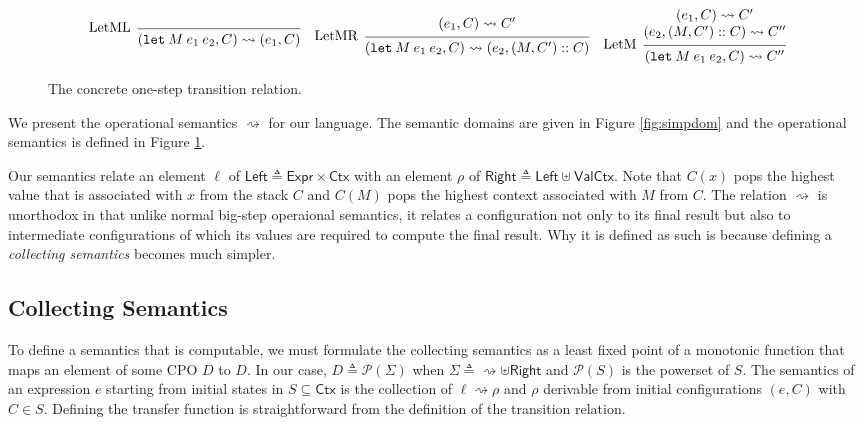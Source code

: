 \documentclass[acmsmall,review]{acmart}\settopmatter{printfolios=true,printccs=false,printacmref=false}
\theoremstyle{definition}
\theoremstyle{plain}
\newcommand*{\cons}{::}
\newcommand*{\pset}{\mathcal{P}}
\newcommand*{\Expr}{\mathsf{Expr}}
\newcommand*{\Ctx}{\mathsf{Ctx}}
\newcommand*{\Value}{\mathsf{Val}}
\newcommand*{\Left}{\mathsf{Left}}
\newcommand*{\Right}{\mathsf{Right}}
\newcommand*{\semarrow}{\rightsquigarrow}
\begin{document}
\begin{figure}[h!]
  \[
    \begin{prooftree}
      \infer[left label=LetML]0{
      (\mathtt{let}\:M\:e_{1}\:e_{2}, C)
      \semarrow
      (e_{1}, C)
      }
    \end{prooftree}\quad
    \begin{prooftree}
      \hypo{
        \begin{matrix}
          (e_{1}, C)
          \semarrow
          C'
        \end{matrix}
      }
      \infer[left label=LetMR]1{
      (\mathtt{let}\:M\:e_{1}\:e_{2}, C)
      \semarrow
      (e_{2}, (M, C')\cons C)
      }
    \end{prooftree}\quad
    \begin{prooftree}
      \hypo{
        \begin{matrix}
          (e_{1}, C)
          \semarrow
          C' \\
          (e_{2}, (M, C')\cons C)
          \semarrow
          C''
        \end{matrix}
      }
      \infer[left label=LetM]1{
      (\mathtt{let}\:M\:e_{1}\:e_{2}, C)
      \semarrow
      C''
      }
    \end{prooftree}
  \]
  \caption{The concrete one-step transition relation.}
  \label{fig:simpreach}
\end{figure}
We present the operational semantics $\semarrow$ for our language.
The semantic domains are given in Figure \ref{fig:simpdom} and the operational semantics is defined in Figure \ref{fig:simpreach}.

Our semantics relate an element $\ell$ of $\Left\triangleq\Expr\times\Ctx$ with an element $\rho$ of $\Right\triangleq\Left\uplus\Value\Ctx$.
Note that $C(x)$ pops the highest value that is associated with $x$ from the stack $C$ and $C(M)$ pops the highest context associated with $M$ from $C$.
The relation $\semarrow$ is unorthodox in that unlike normal big-step operaional semantics, it relates a configuration not only to its final result but also to intermediate configurations of which its values are required to compute the final result.
Why it is defined as such is because defining a \emph{collecting semantics} becomes much simpler.

\subsection{Collecting Semantics}
To define a semantics that is computable, we must formulate the collecting semantics as a least fixed point of a monotonic function that maps an element of some CPO $D$ to $D$.
In our case, $D\triangleq\pset(\Sigma)$ when $\Sigma\triangleq\semarrow\uplus\Right$ and $\pset(S)$ is the powerset of $S$.
The semantics of an expression $e$ starting from initial states in $S\subseteq\Ctx$ is the collection of $\ell\semarrow\rho$ and $\rho$ derivable from initial configurations $(e,C)$ with $C\in S$.
Defining the transfer function is straightforward from the definition of the transition relation.
\end{document}
